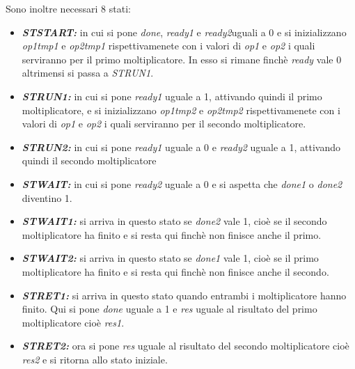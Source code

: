 \documentclass[]{IEEEtran}
\begin{document}
Sono inoltre necessari 8 stati:

\begin{itemize}
\item {\it\bf ST\textunderscore START:} in cui si pone {\it done}, {\it ready1} e {\it ready2}uguali a 0 e si inizializzano {\it op1\textunderscore tmp1} e {\it op2\textunderscore tmp1} rispettivamenete con i valori di {\it op1} e {\it op2} i quali serviranno per il primo moltiplicatore. In esso si rimane finchè {\it ready} vale 0 altrimensi si passa a {\it ST\textunderscore RUN1}.
\item {\it\bf ST\textunderscore RUN1:} in cui si pone {\it ready1} uguale a 1, attivando quindi il primo moltiplicatore, e si inizializzano {\it op1\textunderscore tmp2} e {\it op2\textunderscore tmp2} rispettivamenete con i valori di {\it op1} e {\it op2} i quali serviranno per il secondo moltiplicatore.
\item {\it\bf ST\textunderscore RUN2:} in cui si pone {\it ready1} uguale a 0 e {\it ready2} uguale a 1, attivando quindi il secondo moltiplicatore
\item {\it\bf ST\textunderscore WAIT:} in cui si pone {\it ready2} uguale a 0 e si aspetta che {\it done1} o {\it done2} diventino 1.
\item {\it\bf ST\textunderscore WAIT1:} si arriva in questo stato se {\it done2} vale 1, cioè se il secondo moltiplicatore ha finito e si resta qui finchè non finisce anche il primo.
\item {\it\bf ST\textunderscore WAIT2:} si arriva in questo stato se {\it done1} vale 1, cioè se il primo moltiplicatore ha finito e si resta qui finchè non finisce anche il secondo.
\item {\it\bf ST\textunderscore RET1:} si arriva in questo stato quando entrambi i moltiplicatore hanno finito. Qui si pone {\it done} uguale a 1 e {\it res} uguale al risultato del primo moltiplicatore cioè {\it res1}.
\item {\it\bf ST\textunderscore RET2:} ora si pone {\it res} uguale al risultato del secondo moltiplicatore cioè {\it res2} e si ritorna allo stato iniziale.
\end{itemize}
\end{document}
